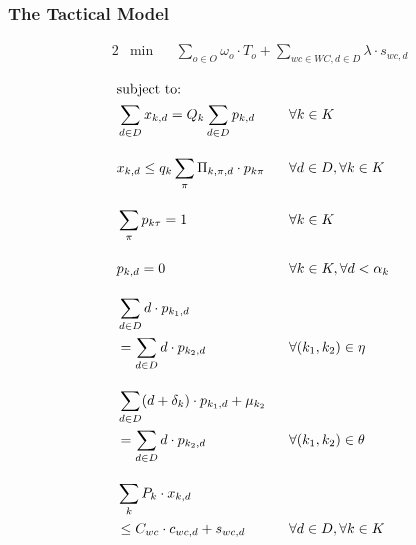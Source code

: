 \documentclass[runningheads]{llncs}
\begin{document}
\subsubsection{The Tactical Model}


\begin{alignat}{2} 
& \min && \sum_{o \in O} \omega_o \cdot T_o + \sum_{wc \in WC, d \in D} \lambda \cdot s_{wc,d} \label{eqn:tactical_objective}
\end{alignat}

\begin{alignat}{2}
    &\text{subject to:}\notag \\
    &\sum_{d \in D} x_{k,d} = Q_k \sum_{d \in D} p_{k,d}                                        \ \ && \forall k \in K                              \label{eqn:tactical_complete_work}  \\[1em]
    &x_{k,d} \leq q_k \sum_{\pi} \Pi_{k, \pi, d} \cdot p_{k\pi}                                 \ \ && \forall d \in D, \forall k \in K             \label{eqn:tactical_operating_time} \\[1em]
    &\sum_{\pi} p_{k\tau} = 1                                                                   \ \ && \forall k \in K                              \label{eqn:tactical_one_pattern}    \\[1em]
    &p_{k,d} = 0                                                                                \ \ && \forall k \in K, \forall d < \alpha_k        \label{eqn:tactical_earliest_starting_time} \\[1em]
    &\sum_{d \in D} d \cdot p_{k_1,d}                                                           \ \ && \notag \\
    & = \sum_{d \in D} d \cdot p_{k_2,d}                                                        \ \ && \forall (k_1, k_2) \in \eta                  \label{eqn:tactical_start_start}    \\[1em]
    &\sum_{d \in D} (d + \delta_k) \cdot p_{k_1,d} + \mu_{k_2}                                  \ \ && \notag \\
    & = \sum_{d \in D} d \cdot p_{k_2,d}                                                        \ \ && \forall (k_1, k_2) \in \theta                \label{eqn:tactical_finish_start} \\[1em]
    &\sum_{k} P_k \cdot x_{k,d}                                                                 \ \ && \notag \\
    & \leq C_{wc} \cdot c_{wc,d} + s_{wc,d}                                                     \ \ && \forall d \in D, \forall k \in K             \label{eqn:tactical_capacity} \\[1em]

\end{alignat}
\end{document}
